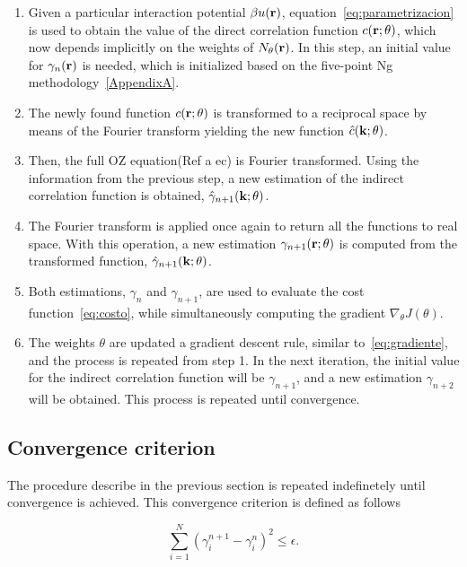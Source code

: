 \begin{enumerate}
    \item Given a particular interaction potential $\beta u(\mathbf{r})$, equation~\eqref{eq:parametrizacion} is used to obtain the value of the direct correlation function $c(\mathbf{r}; \theta)$, which now depends implicitly on the weights of $N_{\theta}(\mathbf{r})$. In this step, an initial value for $\gamma_{n}(\mathbf{r})$ is needed, which is initialized based on the five-point Ng methodology~\ref{AppendixA}.
    \item The newly found function $c(\mathbf{r}; \theta)$ is transformed to a reciprocal space by means of the Fourier transform yielding the new function $\hat{c}(\mathbf{k}; \theta)$.
    \item Then, the full OZ equation(Ref a ec) is Fourier transformed. Using the information from the previous step, a new estimation of the indirect correlation function is obtained, $\hat{\gamma}_{n+1}(\mathbf{k}; \theta)$.
    \item The Fourier transform is applied once again to return all the functions to real space. With this operation, a new estimation $\gamma_{n+1}(\mathbf{r}; \theta)$ is computed from the transformed function, $\hat{\gamma}_{n+1}(\mathbf{k}; \theta)$.
    \item Both estimations, $\gamma_{n}$ and $\gamma_{n+1}$, are used to evaluate the cost function~\eqref{eq:costo}, while simultaneously computing the gradient $\nabla_{\theta} J(\theta)$.
    \item The weights $\theta$ are updated a gradient descent rule, similar to~\eqref{eq:gradiente}, and the process is repeated from step 1. In the next iteration, the initial value for the indirect correlation function will be $\gamma_{n+1}$, and a new estimation $\gamma_{n+2}$ will be obtained. This process is repeated until convergence.
\end{enumerate}

\subsection{Convergence criterion}
The procedure describe in the previous section is repeated indefinetely until convergence
is achieved. This convergence criterion is defined as follows

\begin{equation}
    \sum_{i=1}^{N} {\left( \gamma^{n+1}_{i} - \gamma^{n}_{i} \right)}^2 \leq \epsilon .
    \label{eq:tolerancia}
\end{equation}

